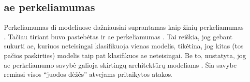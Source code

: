 \subsection{\gls*{ae} perkeliamumas}\label{sec:literature:transfer}
Perkeliamumas \gls{di} modeliuose dažniausiai suprantamas kaip žinių perkeliamumas . Tačiau tiriant  buvo pastebėtas ir \gls{ae} perkeliamumas . Tai reiškia, jog gebant sukurti \gls{ae}, kuriuos neteisingai klasifikuoja vienas modelis, tikėtina, jog kitas (tos pačios paskirties) modelis taip pat klasifikuos \gls{ae} neteisingai. Be to, nustatyta, jog \gls{ae} perkeliamumo savybė galioja skirtingų architektūrų modeliams \cite{demetrioAdversarialEXEmplesSurvey2021}. Šia savybe remiasi visos \enquote{juodos dėžės} atvejams pritaikytos atakos.